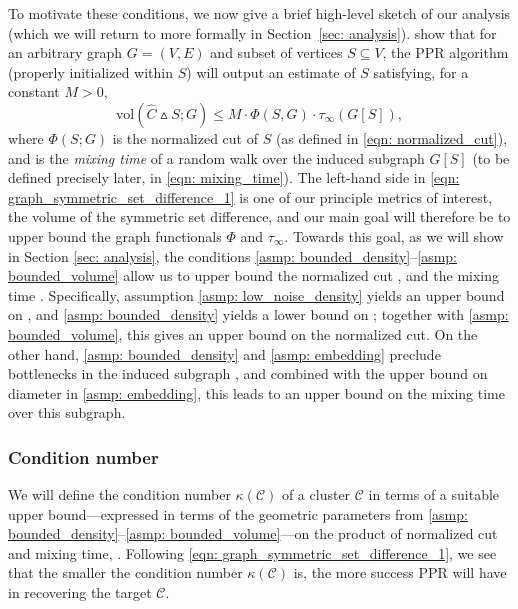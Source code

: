 \documentclass[11pt,twoside]{article}
\newcommand{\vol}{\mathrm{vol}}
\newcommand{\cut}{\mathrm{cut}}
\newcommand{\1}{\mathbbm{1}}
\newcommand{\Xbf}{X}
\newcommand{\Cset}{\mathcal{C}}
\newcommand{\Csig}{\Cset_{\sigma}}
\newcommand{\Cest}{\widehat{C}}
\begin{document}
To motivate these conditions, we now give a brief high-level sketch
of our analysis (which we will return to more formally in Section~\ref{sec:  
  analysis}).  \citet{zhu2013} show that for an arbitrary graph $G = (V,E)$ and
subset of vertices $S \subseteq V$, the PPR algorithm (properly initialized
within $S$) will output an estimate \smash{$\Cest$} of $S$ satisfying, for a
constant $M>0$, 
\begin{equation}
\label{eqn: graph_symmetric_set_difference_1}
\vol(\Cest \vartriangle S; G) \leq M \cdot \Phi(S,G) \cdot \tau_{\infty}(G[S]),    
\end{equation}
where $\Phi(S;G)$ is the normalized cut of $S$ (as defined in \eqref{eqn:
  normalized_cut}), and  is  the \emph{mixing
  time} of a random walk over the induced subgraph $G[S]$ (to be defined
precisely later, in \eqref{eqn: mixing_time}).  The left-hand side in
\eqref{eqn: graph_symmetric_set_difference_1} is one of our principle metrics
of interest, the volume of the symmetric set difference, and our main goal will 
therefore be to upper bound the graph functionals $\Phi$ and $\tau_{\infty}$.
Towards this goal, as we will show in Section
\ref{sec: analysis}, the conditions \ref{asmp: bounded_density}--\ref{asmp: 
  bounded_volume} allow us to upper bound the normalized cut 
\smash{$\Phi(\Csig[\Xbf]; G_{n,r})$}, and the mixing time 
\smash{$\tau_{\infty}(G_{n,r}[\Csig[\Xbf]])$}. Specifically, assumption 
\ref{asmp: low_noise_density} yields an upper
bound on \smash{$\cut(\Csig[\Xbf]; G_{n,r})$}, and \ref{asmp: bounded_density}
yields a lower bound on \smash{$\vol_{n,r}(\Csig[\Xbf])$}; together with 
\ref{asmp: bounded_volume}, this gives an upper bound on the normalized cut.  On 
the other hand, \ref{asmp: bounded_density} and \ref{asmp: embedding} preclude
bottlenecks in the induced subgraph \smash{$G_{n,r}[\Csig[\Xbf]]$}, and combined
with the upper bound on diameter in \ref{asmp: embedding}, this leads to an upper bound on
the mixing time over this subgraph.

\subsubsection{Condition number} 

We will define the condition number $\kappa(\Cset)$ of a cluster $\Cset$ in 
terms of a suitable upper bound---expressed in terms of the geometric parameters
from \ref{asmp: bounded_density}--\ref{asmp: bounded_volume}---on the product of
normalized cut and mixing time, \smash{$\Phi(\Csig[\Xbf]; G_{n,r}) \cdot
  \tau_{\infty}(G_{n,r}[\Csig[\Xbf]])$}. Following \eqref{eqn:
  graph_symmetric_set_difference_1}, we see that the smaller the condition
number $\kappa(\Cset)$ is, the more success PPR will have in recovering the
target $\Cset$.  
\end{document}
